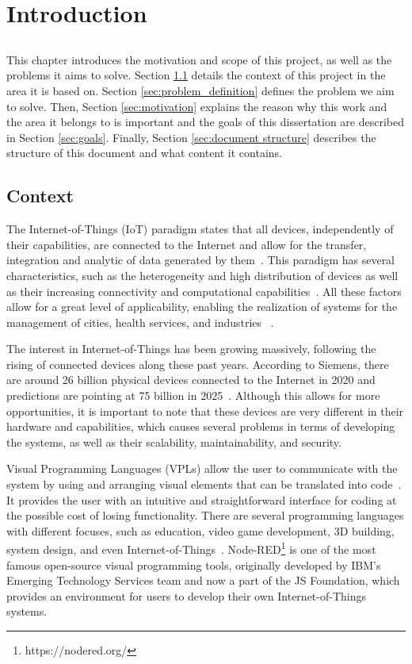 \chapter{Introduction} \label{chap:intro} \minitoc

\section*{}

This chapter introduces the motivation and scope of this project, as well as the problems it aims to solve. Section \ref{sec:context} details the context of this project in the area it is based on. Section \ref{sec:problem_definition} defines the problem we aim to solve. Then, Section \ref{sec:motivation} explains the reason why this work and the area it belongs to is important and the goals of this dissertation are described in Section \ref{sec:goals}. Finally, Section \ref{sec:document structure} describes the structure of this document and what content it contains.

\section{Context} \label{sec:context}

The Internet-of-Things (IoT) paradigm states that all devices, independently of their capabilities, are connected to the Internet and allow for the transfer, integration and analytic of data generated by them~\cite{IoT_principles_and_paradigms}. This paradigm has several characteristics, such as the heterogeneity and high distribution of devices as well as their increasing connectivity and computational capabilities~\cite{SoS}. All these factors allow for a great level of applicability, enabling the realization of systems for the management of cities, health services, and industries ~\cite{6851114}.

The interest in Internet-of-Things has been growing massively, following the rising of connected devices along these past years. According to Siemens, there are around 26 billion physical devices connected to the Internet in 2020 and predictions are pointing at 75 billion in 2025~\cite{tanweer}. Although this allows for more opportunities, it is important to note that these devices are very different in their hardware and capabilities, which causes several problems in terms of developing the systems, as well as their scalability, maintainability, and security. 

Visual Programming Languages (VPLs) allow the user to communicate with the system by using and arranging visual elements that can be translated into code~\cite{vpl-book}. It provides the user with an intuitive and straightforward interface for coding at the possible cost of losing functionality. There are several programming languages with different focuses, such as education, video game development, 3D building, system design, and even Internet-of-Things~\cite{survey_vpl_iot}. Node-RED\footnote{https://nodered.org/} is one of the most famous open-source visual programming tools, originally developed by IBM’s Emerging Technology Services team and now a part of the JS Foundation, which provides an environment for users to develop their own Internet-of-Things systems.

